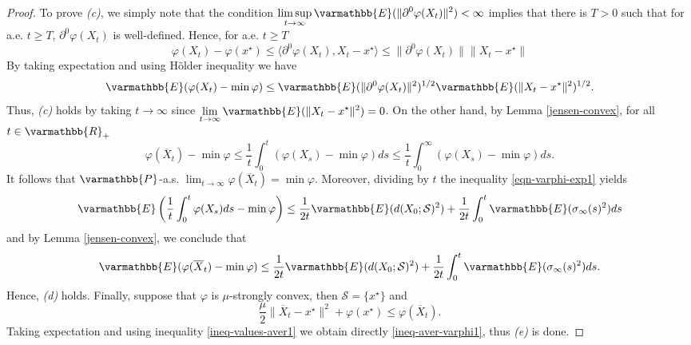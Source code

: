 \documentclass[11pt,reqno]{article}
\let\mathbb=\varmathbb
\newcommand{\R}{\mathbb{R}}
\newcommand{\1}{\mathds{1}}
\newcommand{\Aver}[2]{\overline{#1}_{#2}}
\numberwithin{equation}{section}  %
\theoremstyle{plain}
\theoremstyle{definition}
\theoremstyle{remark}
\numberwithin{theorem}{section}
\numberwithin{remark}{section}
\numberwithin{example}{section}
\begin{document}
\begin{proof}
    To prove \emph{(c)}, we simply note that the condition $\displaystyle\limsup_{t\to \infty}\mathbb{E}(\|\partial^0\varphi(X_t)\|^2)<\infty$ implies that there is $T>0$ such that for a.e. $t\geq T$, $\partial^0\varphi(X_t)$ is well-defined. Hence, for a.e. $t\geq T$
    \begin{equation*}
        \varphi(X_t)-\varphi(x^\star)\leq \langle \partial^0\varphi(X_t), X_t-x^\star\rangle\leq \|\partial^0\varphi(X_t)\|\|X_t-x^\star\|
    \end{equation*}
    By taking expectation and using Hölder inequality we have
    \begin{equation*}
        \mathbb{E}(\varphi(X_t)-\min \varphi)\leq \mathbb{E}(\|\partial^0\varphi(X_t)\|^2)^{1/2}\mathbb{E}(\|X_t-x^\star\|^2)^{1/2}.
    \end{equation*}
    Thus, \emph{(c)} holds by taking $t\to \infty$ since $\displaystyle\lim_{t\to \infty}\mathbb{E}(\|X_t-x^\star\|^2) = 0$.
    On the other hand, by Lemma \ref{jensen-convex}, for all $t\in \R_+$
    \begin{equation*}
        \varphi(\Aver{X}{t})-\min\varphi\leq \frac{1}{t}\int_0^t(\varphi(X_s)-\min \varphi) ds\leq \frac{1}{t}\int_0^\infty(\varphi(X_s)-\min \varphi) ds.
    \end{equation*}
    It follows that $\mathbb{P}$-a.s. $\displaystyle\lim_{t\to \infty} \varphi(\Aver{X}{t})=\min \varphi$. Moreover, dividing by $t$ the inequality \eqref{eqn-varphi-exp1} yields
    \begin{equation*}
        \mathbb{E}\left(\frac{1}{t}\int_0^t \varphi(X_s)ds-\min \varphi\right)\leq \frac{1}{2t}\mathbb{E}(d(X_0;\mathcal{S})^2) + \frac{1}{2t}\int_0^t\mathbb{E}(\sigma_\infty(s)^2) ds
    \end{equation*}
    and by Lemma \ref{jensen-convex}, we conclude that 
    \begin{equation}\label{ineq-values-aver1}
        \mathbb{E}(\varphi(\Aver{X}{t} )-\min \varphi)\leq \frac{1}{2t}\mathbb{E}(d(X_0;\mathcal{S})^2) + \frac{1}{2t}\int_0^t\mathbb{E}(\sigma_\infty(s)^2) ds.
    \end{equation}
    Hence, \emph{(d)} holds. Finally, suppose that $\varphi$ is $\mu$-strongly convex, then $\mathcal{S} = \{x^\star\}$ and 
    \begin{equation*}
        \frac{\mu}{2}\|\Aver{X}{t} -x^\star\|^2 + \varphi(x^\star)\leq \varphi(\Aver{X}{t} ).
    \end{equation*}
    Taking expectation and using inequality \eqref{ineq-values-aver1} we obtain directly \eqref{ineq-aver-varphi1}, thus \emph{(e)} is done.
	\end{proof}
\end{document}
